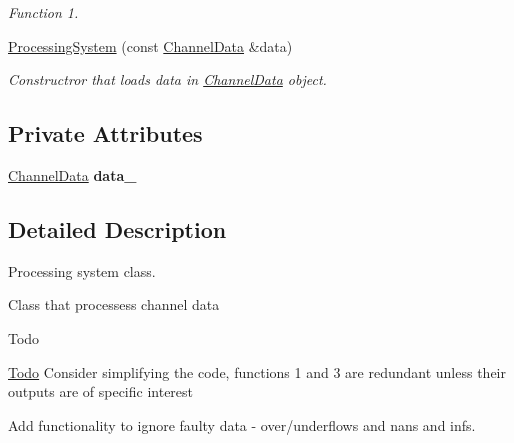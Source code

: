 \begin{DoxyCompactItemize}
\begin{DoxyCompactList}\small\item\em Function 1. \end{DoxyCompactList}\item 
\hyperlink{classIneosTest_1_1ProcessingSystem_adeb83b3bc715d8fc33929e9ff5961ce8}{Processing\-System} (const \hyperlink{classIneosTest_1_1ChannelData}{Channel\-Data} \&data)
\begin{DoxyCompactList}\small\item\em Constructror that loads data in \hyperlink{classIneosTest_1_1ChannelData}{Channel\-Data} object. \end{DoxyCompactList}\end{DoxyCompactItemize}
\subsection*{Private Attributes}
\begin{DoxyCompactItemize}
\item 
\hypertarget{classIneosTest_1_1ProcessingSystem_a2c2f81518431313e82ab908b7133cfd7}{\hyperlink{classIneosTest_1_1ChannelData}{Channel\-Data} {\bfseries data\-\_\-}}\label{classIneosTest_1_1ProcessingSystem_a2c2f81518431313e82ab908b7133cfd7}

\end{DoxyCompactItemize}


\subsection{Detailed Description}
Processing system class. 

Class that processess channel data \begin{DoxyRefDesc}{Todo}
\item[\hyperlink{todo__todo000004}{Todo}]Consider simplifying the code, functions 1 and 3 are redundant unless their outputs are of specific interest 

Add functionality to ignore faulty data -\/ over/underflows and nans and infs. \end{DoxyRefDesc}



